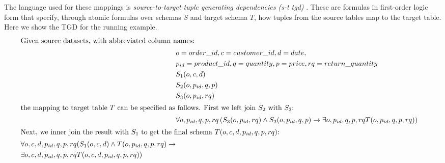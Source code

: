 The language used for these mappings is \textit{source-to-target tuple generating dependencies (s-t tgd)} \cite{tgds-Fagin2009}. These are formulas in first-order logic form that specify, through atomic formulas over schemas $S$ and target schema $T$, how tuples from the source tables map to the target table. Here we show the TGD for the running example.\begin{alignat*}{2}
    \intertext{Given source datasets, with abbreviated column names:}
     & o=order\_id, c=customer\_id, d=date,                                                                                                                      \\
     & p_{id}=product\_id, q=quantity, p=price, rq=return\_quantity                                                                                              \\
     & S_1(o, c, d)                                                                                                                                              \\
     & S_2(o, p_{id} , q,  p)                                                                                                                                    \\
     & S_3(o, p_{id}, rq)                                                                                                                                      & \\
    \intertext{the mapping to target table $T$ can be specified as follows. First we left join $S_2$ with $S_3$:}
     & \forall o, p_{id}, q, p, rq \left( S_3(o, p_{id}, rq) \land S_2(o, p_{id}, q, p) \rightarrow \exists o, p_{id}, q, p, rq T(o, p_{id}, q, p, rq) \right)   \\
    \intertext{Next, we inner join the result with $S_1$ to get the final schema $T(o, c, d, p_{id}, q, p, rq)$:} \begin{split}
                                                                                                                      & \forall o, c, d, p_{id}, q, p, rq ( S_1(o, c, d) \land T(o, p_{id}, q, p, rq) \rightarrow                                                          \\
                                                                                                                      & \exists o, c, d, p_{id}, q, p, rq T(o, c, d, p_{id}, q, p, rq) )
                                                                                                                  \end{split}
\end{alignat*}


